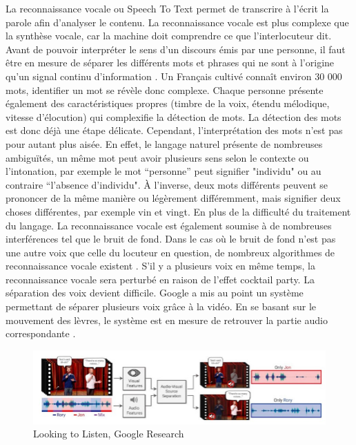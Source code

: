 La reconnaissance vocale ou Speech To Text permet de transcrire à l’écrit la parole afin d’analyser le contenu. La reconnaissance vocale est plus complexe que la synthèse vocale, car la machine doit comprendre ce que l’interlocuteur dit. Avant de pouvoir interpréter le sens d’un discours émis par une personne, il faut être en mesure de séparer les différents mots et phrases qui ne sont à l’origine qu’un signal continu d’information \cite{lienard_les_1977}. Un Français cultivé connaît environ 30 000 mots, identifier un mot se révèle donc complexe. Chaque personne présente également des caractéristiques propres (timbre de la voix, étendu mélodique, vitesse d’élocution) qui complexifie la détection de mots. La détection des mots est donc déjà une étape délicate. Cependant, l’interprétation des mots n’est pas pour autant plus aisée. En effet, le langage naturel présente de nombreuses ambiguïtés, un même mot peut avoir plusieurs sens selon le contexte ou l’intonation, par exemple le mot “personne” peut signifier "individu" ou au contraire “l’absence d'individu". À l’inverse, deux mots différents peuvent se prononcer de la même manière ou légèrement différemment, mais signifier deux choses différentes, par exemple vin et vingt. En plus de la difficulté du traitement du langage. La reconnaissance vocale est également soumise à de nombreuses interférences tel que le bruit de fond. Dans le cas où le bruit de fond n’est pas une autre voix que celle du locuteur en question, de nombreux algorithmes de reconnaissance vocale existent \cite{ibm_cloud_education_what_2020}.
S'il y a plusieurs voix en même temps, la reconnaissance vocale sera perturbé en raison de l’effet cocktail party. La séparation des voix devient difficile. Google a mis au point un système permettant de séparer plusieurs voix grâce à la vidéo. En se basant sur le mouvement des lèvres, le système est en mesure de retrouver la partie audio correspondante  \cite{mosseri_looking_2018}.

\begin{figure}[ht!]
    \centering
    \includegraphics[width=\linewidth]{Rapport/images/google.jpg}
    \caption{Looking to Listen, Google Research}
    \label{fig:googleAI}
\end{figure}

